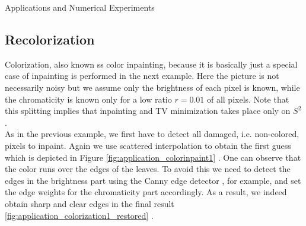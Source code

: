 \begin{chapter}{Applications and Numerical Experiments}


\FloatBarrier
\subsection{Recolorization} %
\label{sub:Recolorization}
Colorization, also known ss color inpainting, because it is basically just a special case of inpainting is performed in the next example.
Here the picture is not necessarily noisy but we assume only the brightness of each pixel is known, while the chromaticity is known only for a low ratio $r=0.01$ of all pixels.
Note that this splitting implies that inpainting and TV minimization takes place only on $S^2$.\\

As in the previous example, we first have to detect all damaged, i.e. non-colored, pixels to inpaint. Again we use scattered interpolation to obtain the first guess which is depicted
in Figure \ref{fig:application_colorinpaint1} . One can observe that the color runs over the edges of the leaves. To avoid this we need to
detect the edges in the brightness part using the Canny edge detector \cite{Canny}, for example, and set the edge weights for the chromaticity part accordingly. As a result, we indeed
obtain sharp and clear edges in the final result \ref{fig:application_colorization1_restored} .


\end{chapter}
